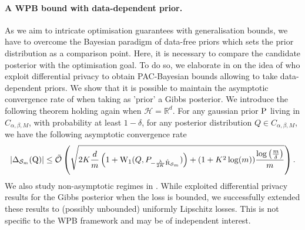 \paragraph{A WPB bound with data-dependent prior.}
As we aim to intricate optimisation guarantees with generalisation bounds, we have to overcome the Bayesian paradigm of data-free priors which sets the prior distribution as a comparison point. Here, it is necessary to compare the candidate posterior with the optimisation goal. To do so, we elaborate in  on the idea of \citet{dziugaite2018data} who exploit differential privacy to obtain PAC-Bayesian bounds allowing to take data-dependent priors. We show that it is possible to maintain the asymptotic convergence rate of  when taking as 'prior' a Gibbs posterior.
We introduce the following theorem holding again when $\mathcal{H}=\mathbb{R}^d$. For any gaussian prior $\P$ living in $C_{\alpha,\beta,M}$, with probability at least $1-\delta$, for any posterior distribution $Q\in C_{\alpha,\beta,M}$, we have the following asymptotic convergence rate
\begin{align*}
|\Delta_{\Sm}(\Q)|  \leq\Tilde{\mathcal{O}}\left( \sqrt{2K\frac{d}{m}\left(1 + \W_{1}(Q,P_{-\frac{\lambda}{2K}\Riskhat_{\Sm}})\right)+(1+K^2\log(m))\frac{\log\left( \frac{m}{\delta} \right)}{m}}   \right).
\end{align*}
We also study non-asymptotic regimes in . While \citet{dziugaite2018data} exploited differential privacy results for the Gibbs posterior when the loss is bounded, we successfully extended these results to (possibly unbounded) uniformly Lipschitz losses. This is not specific to the WPB framework and may be of independent interest.

